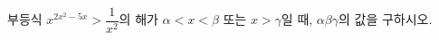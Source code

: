 부등식 $x^{2x^2-5x}>\dfrac{1}{x^2}$의 해가 $\alpha<x<\beta$ 또는 $x>\gamma$일 때, $\alpha\beta\gamma$의 값을 구하시오. 
